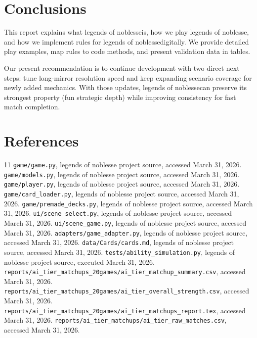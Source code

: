 \documentclass[12pt]{article}
\newcommand{\GameName}{legends of noblesse}
\begin{document}
\section{Conclusions}
This report explains what \GameName is, how we play \GameName, and how we implement rules for \GameName digitally. We provide detailed play examples, map rules to code methods, and present validation data in tables.

Our present recommendation is to continue development with two direct next steps: tune long-mirror resolution speed and keep expanding scenario coverage for newly added mechanics. With those updates, \GameName can preserve its strongest property (fun strategic depth) while improving consistency for fast match completion.

\newpage
\section{References}
\begin{thebibliography}{11}
 \texttt{game/game.py}, legends of noblesse project source, accessed March 31, 2026.
 \texttt{game/models.py}, legends of noblesse project source, accessed March 31, 2026.
 \texttt{game/player.py}, legends of noblesse project source, accessed March 31, 2026.
 \texttt{game/card\_loader.py}, legends of noblesse project source, accessed March 31, 2026.
 \texttt{game/premade\_decks.py}, legends of noblesse project source, accessed March 31, 2026.
 \texttt{ui/scene\_select.py}, legends of noblesse project source, accessed March 31, 2026.
 \texttt{ui/scene\_game.py}, legends of noblesse project source, accessed March 31, 2026.
 \texttt{adapters/game\_adapter.py}, legends of noblesse project source, accessed March 31, 2026.
 \texttt{data/Cards/cards.md}, legends of noblesse project source, accessed March 31, 2026.
 \texttt{tests/ability\_simulation.py}, legends of noblesse project source, executed March 31, 2026.
 \texttt{reports/ai\_tier\_matchups\_20games/ai\_tier\_matchup\_summary.csv}, accessed March 31, 2026.
 \texttt{reports/ai\_tier\_matchups\_20games/ai\_tier\_overall\_strength.csv}, accessed March 31, 2026.
 \texttt{reports/ai\_tier\_matchups\_20games/ai\_tier\_matchups\_report.tex}, accessed March 31, 2026.
 \texttt{reports/ai\_tier\_matchups/ai\_tier\_raw\_matches.csv}, accessed March 31, 2026.
\end{thebibliography}
\end{document}

